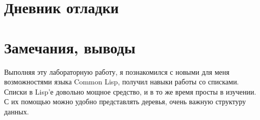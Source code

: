\documentclass[a4paper, 12pt]{article}
\begin{document}
\section{Дневник отладки}

\section{Замечания, выводы}
Выполняя эту лабораторную работу, я познакомился с новыми для меня возможностями языка Common Lisp, получил навыки работы со списками. Списки в Lisp'е довольно мощное средство, и в то же время просты в изучении. С их помощью можно удобно представлять деревья, очень важную структуру данных.
\end{document}
